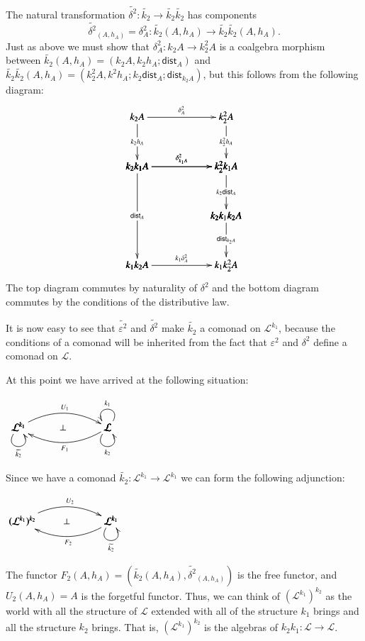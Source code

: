 \documentclass{article}
\let\mto\to
\let\to\relax
\newcommand{\to}{\rightarrow}
\newcommand{\cat}[1]{\mathcal{#1}}
\begin{document}
The natural transformation $\widetilde{\delta^2} : \widetilde{k_2} \mto \widetilde{k_2}\widetilde{k_2}$ has components
\[ \widetilde{\delta^2}_{(A,h_A)} = \delta^2_A : \widetilde{k_2}(A,h_A) \mto \widetilde{k_2}\widetilde{k_2}(A,h_A).\]
Just as above we must show that $\delta^2_A : k_2A \mto k^2_2 A$ is a coalgebra morphism between
$\widetilde{k_2}(A,h_A) = (k_2A,k_2h_A;\mathsf{dist}_A)$ and $\widetilde{k_2}\widetilde{k_2}(A,h_A) = (k^2_2A,k^2h_A;k_2\mathsf{dist}_A;\mathsf{dist}_{k_2A})$, but this follows from the following diagram:
\[
\bfig
\square|amma|<900,500>[
  k_2A`
  k^2_2A`
  k_2k_1A`
  k^2_2k_1A;
  \delta^2_A`
  k_2h_A`
  k^2_2h_A`
  \delta^2_{k_1A}]
\qtriangle(0,-500)|amm|/->``->/<900,500>[
  k_2k_1A`
  k^2_2k_1A`
  k_2k_1k_2A;
  \delta^2_{k_1A}``
  k_2\mathsf{dist}_A]
\dtriangle(0,-1000)|mma|/`->`->/<900,500>[
  k_2k_1k_2A`
  k_1k_2A`
  k_1k^2_2A;`
  \mathsf{dist}_{k_2A}`
  k_1\delta^2_A]

\morphism(0,0)|m|<0,-1000>[
  k_2k_1A`
  k_1k_2A;
  \mathsf{dist}_A]
\efig
\]
The top diagram commutes by naturality of $\delta^2$ and the bottom
diagram commutes by the conditions of the distributive law.

It is now easy to see that $\widetilde{\varepsilon^2}$ and
$\widetilde{\delta^2}$ make $\widetilde{k_2}$ a comonad on
$\cat{L}^{k_1}$, because the conditions of a comonad will be inherited
from the fact that $\varepsilon^2$ and $\delta^2$ define a comonad on
$\cat{L}$.

At this point we have arrived at the following situation:
\begin{center}
  \begin{math}
    \bfig
    \Loop(900,0)\cat{L}(ur,ul)_{k_1}
    \Loop(900,0)\cat{L}(dl,dr)_{k_2}
    \Loop(0,0)\cat{L}^{k_1}(dl,dr)_{\widetilde{k_2}}
    \morphism(0,0)|a|/{@{>}@/^1.5em/}/<900,0>[\cat{L}^{k_1}`\cat{L};U_1]
    \morphism(0,0)|b|/{@{<-}@/_1.5em/}/<900,0>[\cat{L}^{k_1}`\cat{L};F_1]
    \place(450,0)[\perp]
    \efig
  \end{math}
\end{center}
Since we have a comonad $\widetilde{k_2} : \cat{L}^{k_1} \mto
\cat{L}^{k_1}$ we can form the following adjunction:
\begin{center}
  \begin{math}
    \bfig
    \Loop(900,0)\cat{L}^{k_1}(dl,dr)_{\widetilde{k_2}}
    \morphism(0,0)|a|/{@{>}@/^1.5em/}/<900,0>[(\cat{L}^{k_1})^{k_2}`\cat{L}^{k_1};U_2]
    \morphism(0,0)|b|/{@{<-}@/_1.5em/}/<900,0>[(\cat{L}^{k_1})^{k_2}`\cat{L}^{k_1};F_2]
    \place(450,0)[\perp]
    \efig
  \end{math}
\end{center}
The functor $F_2(A,h_A) = (\widetilde{k_2}(A,h_A),
\widetilde{\delta^2}_{(A,h_A)})$ is the free functor, and $U_2(A,h_A) = A$ is
the forgetful functor.  Thus, we can think of $(\cat{L}^{k_1})^{k_2}$
as the world with all the structure of $\cat{L}$ extended with all of
the structure $k_1$ brings and all the structure $k_2$ brings.  That
is, $(\cat{L}^{k_1})^{k_2}$ is the algebras of $k_2k_1 : \cat{L} \mto
\cat{L}$.
\end{document}
